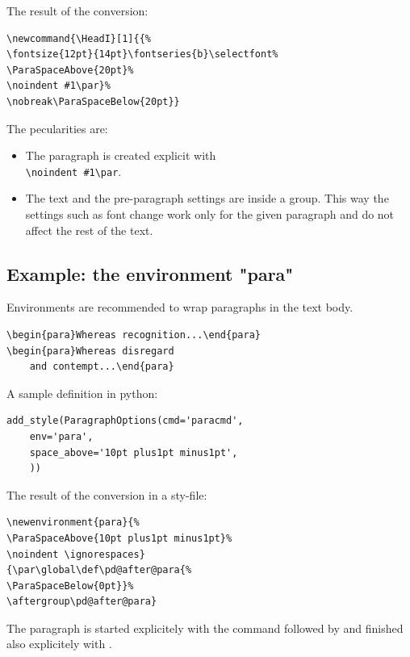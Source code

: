 \documentclass[]{ltugboat}
\begin{document}
The result of the conversion:

\begin{verbatim}
\newcommand{\HeadI}[1]{{%
\fontsize{12pt}{14pt}\fontseries{b}\selectfont%
\ParaSpaceAbove{20pt}%
\noindent #1\par}%
\nobreak\ParaSpaceBelow{20pt}}
\end{verbatim}

The pecularities are:

\begin{itemize}
\item The paragraph is created explicit with\\\verb|\noindent #1\par|.
\item The text and the pre-paragraph settings are inside a group. This way the settings such as font change work only for the given paragraph and do not affect the rest of the text.
\end{itemize}

\subsection{Example: the environment "para"}

Environments are recommended to wrap paragraphs in the text body.

\begin{verbatim}
\begin{para}Whereas recognition...\end{para}
\begin{para}Whereas disregard
    and contempt...\end{para}
\end{verbatim}

A sample definition in python:

\begin{verbatim}
add_style(ParagraphOptions(cmd='paracmd',
    env='para',
    space_above='10pt plus1pt minus1pt',
    ))
\end{verbatim}

The result of the conversion in a sty-file:

\begin{verbatim}
\newenvironment{para}{%
\ParaSpaceAbove{10pt plus1pt minus1pt}%
\noindent \ignorespaces}
{\par\global\def\pd@after@para{%
\ParaSpaceBelow{0pt}}%
\aftergroup\pd@after@para}
\end{verbatim}

The paragraph is started explicitely with the command  followed by  and finished also explicitely with .
\end{document}

